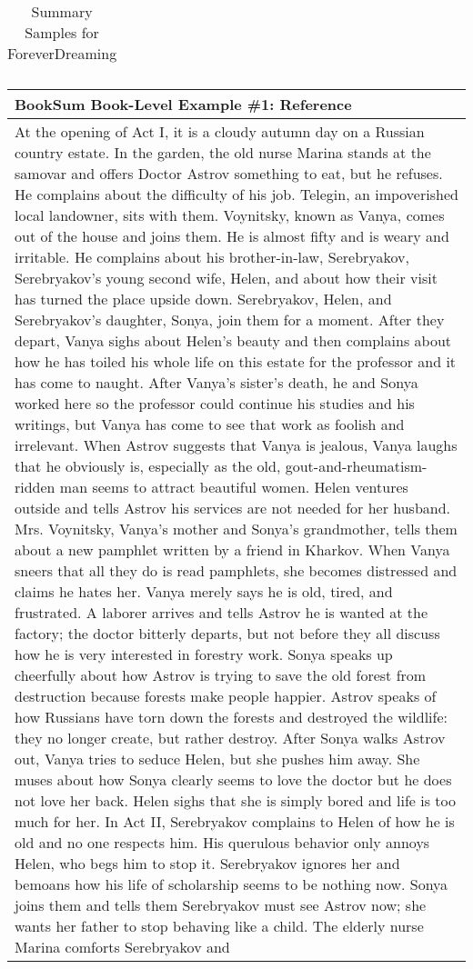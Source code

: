 \documentclass{article} \usepackage{iclr2022_conference,times}
\begin{document}
\begin{table}[!htbp]
\begin{tabular}{p{\linewidth}}
    \\
    \bottomrule
    \end{tabular}
    \caption{
    Summary Samples for ForeverDreaming
    }
\end{table}





\begin{table}[!htbp]
    \centering
    \tiny
    \begin{tabular}{p{\linewidth}} 
    \toprule
    \textbf{BookSum Book-Level Example \#1: Reference} \\
    \midrule
At the opening of Act I, it is a cloudy autumn day on a Russian country estate. In the garden, the old nurse Marina stands at the samovar and offers Doctor Astrov something to eat, but he refuses. He complains about the difficulty of his job. Telegin, an impoverished local landowner, sits with them. Voynitsky, known as Vanya, comes out of the house and joins them. He is almost fifty and is weary and irritable. He complains about his brother-in-law, Serebryakov, Serebryakov's young second wife, Helen, and about how their visit has turned the place upside down. Serebryakov, Helen, and Serebryakov's daughter, Sonya, join them for a moment. After they depart, Vanya sighs about Helen's beauty and then complains about how he has toiled his whole life on this estate for the professor and it has come to naught. After Vanya's sister's death, he and Sonya worked here so the professor could continue his studies and his writings, but Vanya has come to see that work as foolish and irrelevant. When Astrov suggests that Vanya is jealous, Vanya laughs that he obviously is, especially as the old, gout-and-rheumatism-ridden man seems to attract beautiful women. Helen ventures outside and tells Astrov his services are not needed for her husband. Mrs. Voynitsky, Vanya's mother and Sonya's grandmother, tells them about a new pamphlet written by a friend in Kharkov. When Vanya sneers that all they do is read pamphlets, she becomes distressed and claims he hates her. Vanya merely says he is old, tired, and frustrated. A laborer arrives and tells Astrov he is wanted at the factory; the doctor bitterly departs, but not before they all discuss how he is very interested in forestry work. Sonya speaks up cheerfully about how Astrov is trying to save the old forest from destruction because forests make people happier. Astrov speaks of how Russians have torn down the forests and destroyed the wildlife: they no longer create, but rather destroy. After Sonya walks Astrov out, Vanya tries to seduce Helen, but she pushes him away. She muses about how Sonya clearly seems to love the doctor but he does not love her back. Helen sighs that she is simply bored and life is too much for her. In Act II, Serebryakov complains to Helen of how he is old and no one respects him. His querulous behavior only annoys Helen, who begs him to stop it. Serebryakov ignores her and bemoans how his life of scholarship seems to be nothing now. Sonya joins them and tells them Serebryakov must see Astrov now; she wants her father to stop behaving like a child. The elderly nurse Marina comforts Serebryakov and 
\end{tabular}
\end{table}
\end{document}
